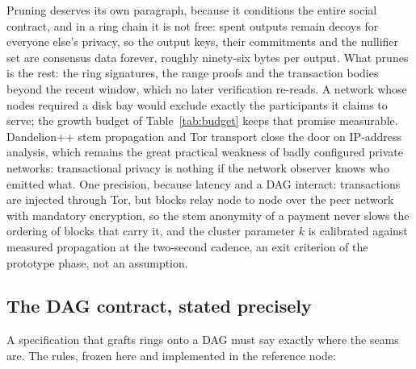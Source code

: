 Pruning deserves its own paragraph, because it conditions the entire social
contract, and in a ring chain it is not free: spent outputs remain decoys
for everyone else's privacy, so the output keys, their commitments and the
nullifier set are consensus data forever, roughly ninety-six bytes per
output. What prunes is the rest: the ring signatures, the range proofs and
the transaction bodies beyond the recent window, which no later
verification re-reads. A network whose nodes required a disk bay would
exclude exactly the participants it claims to serve; the growth budget of
Table~\ref{tab:budget} keeps that promise measurable. Dandelion++ stem
propagation and Tor transport close the door on IP-address analysis, which
remains the great practical weakness of badly configured private networks:
transactional privacy is nothing if the network observer knows who emitted
what. One precision, because latency and a DAG interact: transactions are
injected through Tor, but blocks relay node to node over the peer network
with mandatory encryption, so the stem anonymity of a payment never slows
the ordering of blocks that carry it, and the cluster parameter $k$ is
calibrated against measured propagation at the two-second cadence, an exit
criterion of the prototype phase, not an assumption.

\subsection{The DAG contract, stated precisely}

A specification that grafts rings onto a DAG must say exactly where the
seams are. The rules, frozen here and implemented in the reference node:


